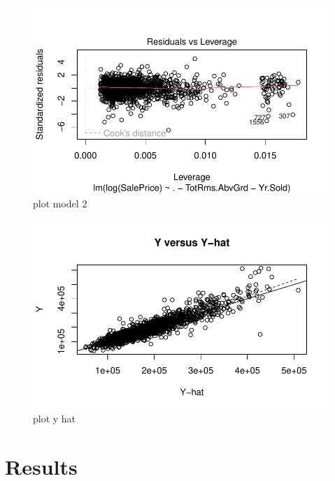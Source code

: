 \documentclass[
  letterpaper,
  DIV=11,
  numbers=noendperiod]{scrartcl}
\begin{document}
\begin{figure}[H]

{\centering \includegraphics{paper_files/figure-pdf/plotmodel2-4.pdf}

}

\caption{plot model 2}

\end{figure}%

\begin{figure}[H]

{\centering \includegraphics{paper_files/figure-pdf/plothat-1.pdf}

}

\caption{plot y hat}

\end{figure}%

\section{Results}\label{results}
\end{document}
